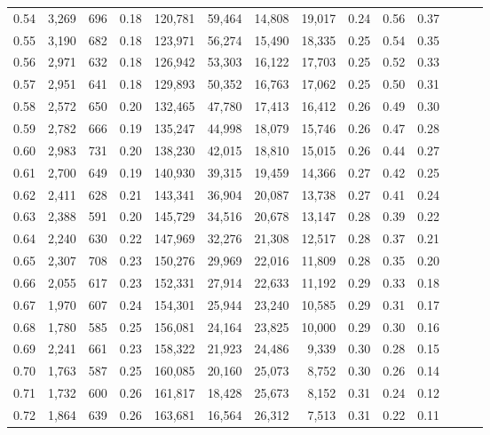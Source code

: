 \begin{tabular}{rrrrrrrrrrrrrr}
0.54 &  3,269 &  696 &  0.18 &  120,781 &   59,464 &  14,808 &  19,017 &  0.24 &  0.56 &      0.37 \\
0.55 &  3,190 &  682 &  0.18 &  123,971 &   56,274 &  15,490 &  18,335 &  0.25 &  0.54 &      0.35 \\
0.56 &  2,971 &  632 &  0.18 &  126,942 &   53,303 &  16,122 &  17,703 &  0.25 &  0.52 &      0.33 \\
0.57 &  2,951 &  641 &  0.18 &  129,893 &   50,352 &  16,763 &  17,062 &  0.25 &  0.50 &      0.31 \\
0.58 &  2,572 &  650 &  0.20 &  132,465 &   47,780 &  17,413 &  16,412 &  0.26 &  0.49 &      0.30 \\
0.59 &  2,782 &  666 &  0.19 &  135,247 &   44,998 &  18,079 &  15,746 &  0.26 &  0.47 &      0.28 \\
0.60 &  2,983 &  731 &  0.20 &  138,230 &   42,015 &  18,810 &  15,015 &  0.26 &  0.44 &      0.27 \\
0.61 &  2,700 &  649 &  0.19 &  140,930 &   39,315 &  19,459 &  14,366 &  0.27 &  0.42 &      0.25 \\
0.62 &  2,411 &  628 &  0.21 &  143,341 &   36,904 &  20,087 &  13,738 &  0.27 &  0.41 &      0.24 \\
0.63 &  2,388 &  591 &  0.20 &  145,729 &   34,516 &  20,678 &  13,147 &  0.28 &  0.39 &      0.22 \\
0.64 &  2,240 &  630 &  0.22 &  147,969 &   32,276 &  21,308 &  12,517 &  0.28 &  0.37 &      0.21 \\
0.65 &  2,307 &  708 &  0.23 &  150,276 &   29,969 &  22,016 &  11,809 &  0.28 &  0.35 &      0.20 \\
0.66 &  2,055 &  617 &  0.23 &  152,331 &   27,914 &  22,633 &  11,192 &  0.29 &  0.33 &      0.18 \\
0.67 &  1,970 &  607 &  0.24 &  154,301 &   25,944 &  23,240 &  10,585 &  0.29 &  0.31 &      0.17 \\
0.68 &  1,780 &  585 &  0.25 &  156,081 &   24,164 &  23,825 &  10,000 &  0.29 &  0.30 &      0.16 \\
0.69 &  2,241 &  661 &  0.23 &  158,322 &   21,923 &  24,486 &   9,339 &  0.30 &  0.28 &      0.15 \\
0.70 &  1,763 &  587 &  0.25 &  160,085 &   20,160 &  25,073 &   8,752 &  0.30 &  0.26 &      0.14 \\
0.71 &  1,732 &  600 &  0.26 &  161,817 &   18,428 &  25,673 &   8,152 &  0.31 &  0.24 &      0.12 \\
0.72 &  1,864 &  639 &  0.26 &  163,681 &   16,564 &  26,312 &   7,513 &  0.31 &  0.22 &      0.11 \\

\end{tabular}
